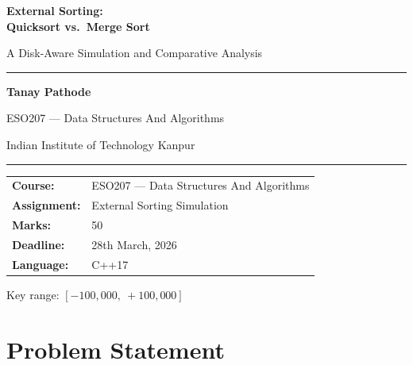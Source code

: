 \documentclass[12pt,a4paper]{article}
\begin{document}
\begin{titlepage}
  \centering
  \vspace*{1.5cm}

  {\Huge\bfseries\color{iitblue}
    External Sorting:\\[0.3em]
    Quicksort vs.\ Merge Sort\par}

  \vspace{0.8cm}
  {\large\color{codegray}A Disk-Aware Simulation and Comparative Analysis\par}

  \vspace{1.5cm}
  \rule{0.6\textwidth}{1.2pt}
  \vspace{1cm}

  {\Large\textbf{Tanay Pathode}\par}
  \vspace{0.4cm}
  {\large ESO207 — Data Structures And Algorithms\par}
  {\large Indian Institute of Technology Kanpur\par}

  \vspace{1.5cm}
  \rule{0.6\textwidth}{0.6pt}
  \vspace{1cm}

  \begin{tabular}{ll}
    \textbf{Course:}    & ESO207 — Data Structures And Algorithms \\[4pt]
    \textbf{Assignment:}& External Sorting Simulation \\[4pt]
    \textbf{Marks:}     & 50 \\[4pt]
    \textbf{Deadline:}  & 28th March, 2026 \\[4pt]
    \textbf{Language:}  & C++17
  \end{tabular}

  \vfill
  {\small\color{codegray}Key range: $[-100{,}000,\ +100{,}000]$\par}
\end{titlepage}

\tableofcontents
\newpage

\section{Problem Statement}
\end{document}
